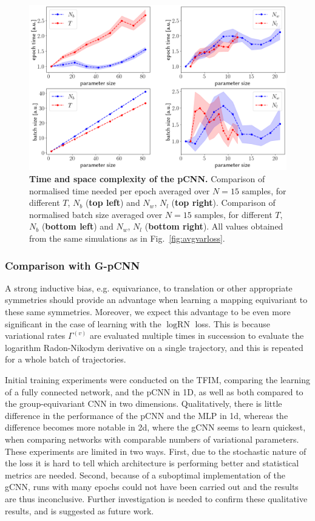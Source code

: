 \begin{figure}[H]
	\centering
	\includegraphics[width=\linewidth]{Chapter5/Figs/Raster/initial_time_space}
	\caption[Time and space complexity of the pCNN]{\textbf{Time and space complexity of the pCNN.} Comparison of normalised time needed per epoch averaged over $N=15$ samples, for different $T$, $N_b$ (\textbf{top left}) and $N_w$, $N_l$ (\textbf{top right}). Comparison of normalised batch size averaged over $N=15$ samples, for different $T$, $N_b$ (\textbf{bottom left}) and $N_w$, $N_l$ (\textbf{bottom right}). All values obtained from the same simulations as in Fig.~\ref{fig:avgvarloss}.}
	\label{fig:initialtimespace}
\end{figure}

\subsubsection{Comparison with G-pCNN}
A strong inductive bias, e.g. equivariance, to translation or other appropriate symmetries should provide an advantage when learning a mapping equivariant to these same symmetries. Moreover, we expect this advantage to be even more significant in the case of learning with the $\log \text{RN}$ loss. This is because variational rates $\Gamma^{(v)}$ are evaluated multiple times in succession to evaluate the logarithm Radon-Nikodym derivative on a single trajectory, and this is repeated for a whole batch of trajectories.  

Initial training experiments were conducted on the TFIM, comparing the learning of a fully connected network, and the pCNN in 1D, as well as both compared to the group-equivariant CNN in two dimensions. Qualitatively, there is little difference in the performance of the pCNN and the MLP in 1d, whereas the difference becomes more notable in 2d, where the gCNN seems to learn quickest, when comparing networks with comparable numbers of variational parameters. These experiments are limited in two ways. First, due to the stochastic nature of the loss it is hard to tell which architecture is performing better and statistical metrics are needed. Second, because of a suboptimal implementation of the gCNN, runs with many epochs could not have been carried out and the results are thus inconclusive. Further investigation is needed to confirm these qualitative results, and is suggested as future work. 

